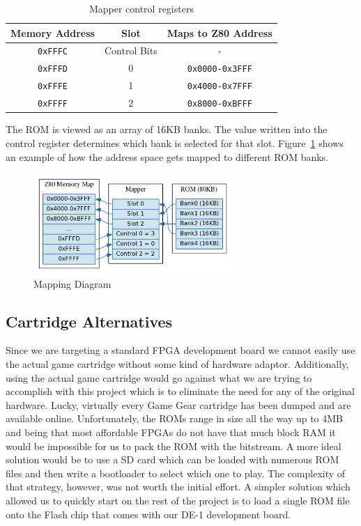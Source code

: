 \documentclass{article}
\begin{document}
\begin{table}[H]
    \centering
    \begin{tabular}{ccc}
        \toprule
        \textbf{Memory Address} & \textbf{Slot} & \textbf{Maps to Z80 Address} \\
        \midrule
        \texttt{0xFFFC} & Control Bits & - \\
        \texttt{0xFFFD} & 0            & \texttt{0x0000-0x3FFF} \\
        \texttt{0xFFFE} & 1            & \texttt{0x4000-0x7FFF} \\
        \texttt{0xFFFF} & 2            & \texttt{0x8000-0xBFFF} \\
        \bottomrule
    \end{tabular}
    \caption{Mapper control registers \protect\cite{mapper}}
\end{table}

The ROM is viewed as an array of 16KB banks. The value written into the control
register determines which bank is selected for that slot.
Figure~\ref{fig:mapping_diagram} shows an example of how the address space gets
mapped to different ROM banks.

\begin{figure}[H]
\centering
\includegraphics[height=1.5in]{../images/mapper.png}
\caption{Mapping Diagram}
\label{fig:mapping_diagram}
\end{figure}

\subsection{Cartridge Alternatives}
Since we are targeting a standard FPGA development board we cannot easily use
the actual game cartridge without some kind of hardware adaptor.  Additionally,
using the actual game cartridge would go against what we are trying to
accomplish with this project which is to eliminate the need for any of the
original hardware. Lucky, virtually every Game Gear cartridge has been dumped
and are available online.  Unfortunately, the ROMs range in size all the way up
to 4MB and being that most affordable FPGAs do not have that much block RAM it
would be impossible for us to pack the ROM with the bitstream. A more ideal
solution would be to use a SD card which can be loaded with numerous ROM files
and then write a bootloader to select which one to play.  The complexity of
that strategy, however, was not worth the initial effort. A simpler solution
which allowed us to quickly start on the rest of the project is to load a
single ROM file onto the Flash chip that comes with our DE-1 development board.
\end{document}
